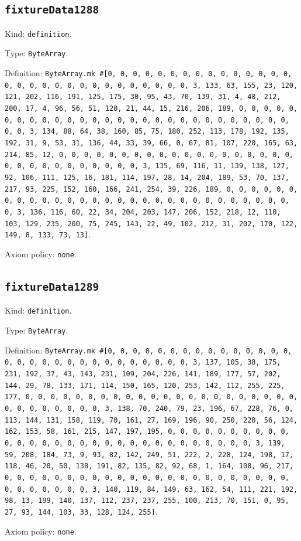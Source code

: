 \documentclass[11pt]{article}
\begin{document}
\subsection*{\texttt{fixtureData1288}}
\noindent Kind: \texttt{definition}.\par
\noindent Type: \texttt{ByteArray}.\par
\noindent Definition: \texttt{ByteArray.mk \#[0, 0, 0, 0, 0, 0, 0, 0, 0, 0, 0, 0, 0, 0, 0, 0, 0, 0, 0, 0, 0, 0, 0, 0, 0, 0, 0, 0, 0, 0, 3, 133, 63, 155, 23, 120, 121, 202, 116, 191, 125, 175, 30, 95, 43, 70, 139, 31, 4, 48, 212, 200, 17, 4, 96, 56, 51, 120, 21, 44, 15, 216, 206, 189, 0, 0, 0, 0, 0, 0, 0, 0, 0, 0, 0, 0, 0, 0, 0, 0, 0, 0, 0, 0, 0, 0, 0, 0, 0, 0, 0, 0, 0, 0, 3, 134, 88, 64, 38, 160, 85, 75, 180, 252, 113, 178, 192, 135, 192, 31, 9, 53, 31, 136, 44, 33, 39, 66, 0, 67, 81, 107, 220, 165, 63, 214, 85, 12, 0, 0, 0, 0, 0, 0, 0, 0, 0, 0, 0, 0, 0, 0, 0, 0, 0, 0, 0, 0, 0, 0, 0, 0, 0, 0, 0, 0, 0, 0, 3, 135, 69, 116, 11, 139, 138, 127, 92, 106, 111, 125, 16, 181, 114, 197, 28, 14, 204, 189, 53, 70, 137, 217, 93, 225, 152, 160, 166, 241, 254, 39, 226, 189, 0, 0, 0, 0, 0, 0, 0, 0, 0, 0, 0, 0, 0, 0, 0, 0, 0, 0, 0, 0, 0, 0, 0, 0, 0, 0, 0, 0, 0, 0, 3, 136, 116, 60, 22, 34, 204, 203, 147, 206, 152, 218, 12, 110, 103, 129, 235, 200, 75, 245, 143, 22, 49, 102, 212, 31, 202, 170, 122, 149, 8, 133, 73, 13]}.\par
\noindent Axiom policy: \texttt{none}.\par
\subsection*{\texttt{fixtureData1289}}
\noindent Kind: \texttt{definition}.\par
\noindent Type: \texttt{ByteArray}.\par
\noindent Definition: \texttt{ByteArray.mk \#[0, 0, 0, 0, 0, 0, 0, 0, 0, 0, 0, 0, 0, 0, 0, 0, 0, 0, 0, 0, 0, 0, 0, 0, 0, 0, 0, 0, 0, 0, 3, 137, 105, 38, 175, 231, 192, 37, 43, 143, 231, 109, 204, 226, 141, 189, 177, 57, 202, 144, 29, 78, 133, 171, 114, 150, 165, 120, 253, 142, 112, 255, 225, 177, 0, 0, 0, 0, 0, 0, 0, 0, 0, 0, 0, 0, 0, 0, 0, 0, 0, 0, 0, 0, 0, 0, 0, 0, 0, 0, 0, 0, 0, 0, 3, 138, 70, 240, 79, 23, 196, 67, 228, 76, 0, 113, 144, 131, 158, 119, 70, 161, 27, 169, 196, 90, 250, 220, 56, 124, 162, 153, 58, 161, 215, 147, 197, 195, 0, 0, 0, 0, 0, 0, 0, 0, 0, 0, 0, 0, 0, 0, 0, 0, 0, 0, 0, 0, 0, 0, 0, 0, 0, 0, 0, 0, 0, 0, 3, 139, 59, 208, 184, 73, 9, 93, 82, 142, 249, 51, 222, 2, 228, 124, 198, 17, 118, 46, 20, 50, 138, 191, 82, 135, 82, 92, 68, 1, 164, 108, 96, 217, 0, 0, 0, 0, 0, 0, 0, 0, 0, 0, 0, 0, 0, 0, 0, 0, 0, 0, 0, 0, 0, 0, 0, 0, 0, 0, 0, 0, 0, 0, 3, 140, 119, 84, 149, 63, 162, 54, 111, 221, 192, 98, 13, 199, 140, 137, 112, 237, 237, 255, 100, 213, 70, 151, 0, 95, 27, 93, 144, 103, 33, 128, 124, 255]}.\par
\noindent Axiom policy: \texttt{none}.\par
\end{document}
